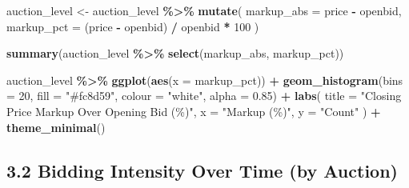 \documentclass[
]{article}
\newenvironment{Shaded}{\begin{snugshade}}{\end{snugshade}}
\newcommand{\AttributeTok}[1]{\textcolor[rgb]{0.13,0.29,0.53}{#1}}
\newcommand{\DecValTok}[1]{\textcolor[rgb]{0.00,0.00,0.81}{#1}}
\newcommand{\FloatTok}[1]{\textcolor[rgb]{0.00,0.00,0.81}{#1}}
\newcommand{\FunctionTok}[1]{\textcolor[rgb]{0.13,0.29,0.53}{\textbf{#1}}}
\newcommand{\NormalTok}[1]{#1}
\newcommand{\OtherTok}[1]{\textcolor[rgb]{0.56,0.35,0.01}{#1}}
\newcommand{\SpecialCharTok}[1]{\textcolor[rgb]{0.81,0.36,0.00}{\textbf{#1}}}
\newcommand{\StringTok}[1]{\textcolor[rgb]{0.31,0.60,0.02}{#1}}
\begin{document}
\begin{Shaded}
\begin{Highlighting}[]
\NormalTok{auction\_level }\OtherTok{\textless{}{-}}\NormalTok{ auction\_level }\SpecialCharTok{\%\textgreater{}\%}
  \FunctionTok{mutate}\NormalTok{(}
    \AttributeTok{markup\_abs =}\NormalTok{ price }\SpecialCharTok{{-}}\NormalTok{ openbid,}
    \AttributeTok{markup\_pct =}\NormalTok{ (price }\SpecialCharTok{{-}}\NormalTok{ openbid) }\SpecialCharTok{/}\NormalTok{ openbid }\SpecialCharTok{*} \DecValTok{100}
\NormalTok{  )}

\FunctionTok{summary}\NormalTok{(auction\_level }\SpecialCharTok{\%\textgreater{}\%} \FunctionTok{select}\NormalTok{(markup\_abs, markup\_pct))}

\NormalTok{auction\_level }\SpecialCharTok{\%\textgreater{}\%}
  \FunctionTok{ggplot}\NormalTok{(}\FunctionTok{aes}\NormalTok{(}\AttributeTok{x =}\NormalTok{ markup\_pct)) }\SpecialCharTok{+}
  \FunctionTok{geom\_histogram}\NormalTok{(}\AttributeTok{bins =} \DecValTok{20}\NormalTok{, }\AttributeTok{fill =} \StringTok{"\#fc8d59"}\NormalTok{, }\AttributeTok{colour =} \StringTok{"white"}\NormalTok{, }\AttributeTok{alpha =} \FloatTok{0.85}\NormalTok{) }\SpecialCharTok{+}
  \FunctionTok{labs}\NormalTok{(}
    \AttributeTok{title =} \StringTok{"Closing Price Markup Over Opening Bid (\%)"}\NormalTok{,}
    \AttributeTok{x     =} \StringTok{"Markup (\%)"}\NormalTok{,}
    \AttributeTok{y     =} \StringTok{"Count"}
\NormalTok{  ) }\SpecialCharTok{+}
  \FunctionTok{theme\_minimal}\NormalTok{()}
\end{Highlighting}
\end{Shaded}

\subsection{3.2 Bidding Intensity Over Time (by
Auction)}\label{bidding-intensity-over-time-by-auction}
\end{document}
